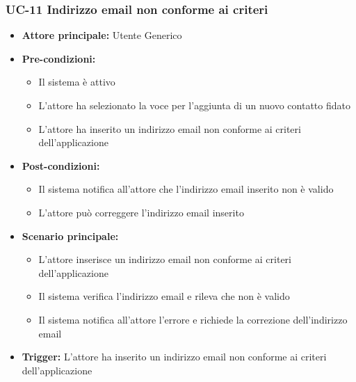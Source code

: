 \documentclass[a4paper,12pt]{article}
\newcommand{\ignoreglossary}{}
\begin{document}
\subsubsection{UC-11 Indirizzo email non conforme ai criteri} \label{subsec:UC-11}
\begin{itemize}
    \item \textbf{Attore principale:} Utente Generico
    \item \textbf{Pre-condizioni:}
    \begin{itemize}
        \item Il sistema è attivo
        \item L'attore ha selezionato la voce per l'aggiunta di un nuovo contatto fidato
        \item L'attore ha inserito un indirizzo email non conforme ai criteri dell'applicazione
    \end{itemize}
    \item \textbf{Post-condizioni:} 
    \begin{itemize}
        \item Il sistema notifica all'attore che l'indirizzo email inserito non è valido
        \item L'attore può correggere l'indirizzo email inserito
    \end{itemize}
    \item \textbf{Scenario principale:} 
    \begin{itemize}        
        \item L'attore inserisce un indirizzo email non conforme ai criteri dell'applicazione
        \item Il sistema \ignoreglossary{verifica} l'indirizzo email e rileva che non è valido
        \item Il sistema notifica all'attore l'errore e richiede la correzione dell'indirizzo email
    \end{itemize}
    \item \textbf{Trigger:} L'attore ha inserito un indirizzo email non conforme ai criteri dell'applicazione
\end{itemize}

\end{document}
